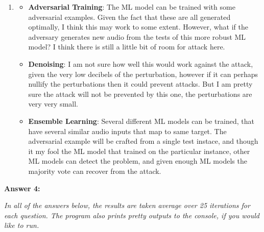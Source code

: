 \documentclass[12pt,reqno]{amsart}
\begin{document}
\begin{enumerate}[label=(\alph*)]
\item \begin{itemize}
	\item \textbf{Adversarial Training}: The ML model can be trained with some adversarial examples. Given the fact that these are all generated optimally, I think this may work to some extent. However, what if the adversary generates new audio from the tests of this more robust ML model? I think there is still a little bit of room for attack here.
	\item \textbf{Denoising}: I am not sure how well this would work against the attack, given the very low decibels of the perturbation, however if it can perhaps nullify the perturbations then it could prevent attacks. But I am pretty sure the attack will not be prevented by this one, the perturbations are very very small.
	\item \textbf{Ensemble Learning}: Several different ML models can be trained, that have several similar audio inputs that map to same target. The adversarial example will be crafted from a single test instace, and though it my fool the ML model that trained on the particular instance, other ML models can detect the problem, and given enough ML models the majority vote can recover from the attack.
			
\end{itemize}

\end{enumerate}

\newpage
\textbf{Answer 4:} 

\textit{In all of the answers below, the results are taken average over 25 iterations for each question. The program also prints pretty outputs to the console, if you would like to run.}
\end{document}
